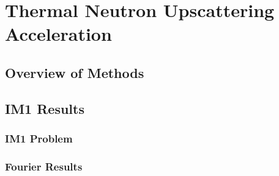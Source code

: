\documentclass[compress,10pt]{beamer}
\begin{document}
\section[Upscattering Acceleration]{Thermal Neutron Upscattering Acceleration}
\subsection{Overview of Methods}

\subsection{IM1 Results}
\begin{frame}[t]\frametitle{IM1 Problem}

\end{frame}
\begin{frame}[t]\frametitle{Fourier Results}

\end{frame}
\end{document}
